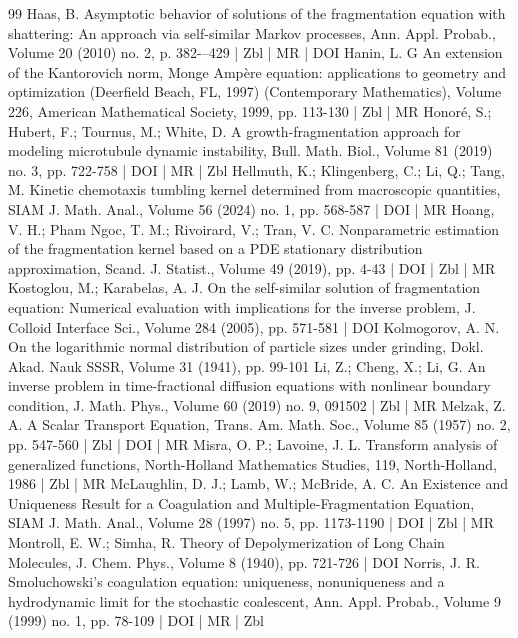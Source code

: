 \documentclass[10pt]{amsart}
\theoremstyle{definition}\newtheorem{defi}[theo]{Definition}\newtheorem{rema}[theo]{Remark}\newtheorem{exam}[theo]{Example}\newtheorem{exem}[theo]{Example}\newtheorem{nota}[theo]{Notation}
\begin{document}
\begin{thebibliography}{99}
Haas, B. Asymptotic behavior of solutions of the fragmentation equation with shattering: An approach via self-similar Markov processes, Ann. Appl. Probab., Volume 20 (2010) no. 2, p. 382-–429 | Zbl | MR | DOI
Hanin, L. G An extension of the Kantorovich norm, Monge Ampère equation: applications to geometry and optimization (Deerfield Beach, FL, 1997) (Contemporary Mathematics), Volume 226, American Mathematical Society, 1999, pp. 113-130 | Zbl | MR
Honoré, S.; Hubert, F.; Tournus, M.; White, D. A growth-fragmentation approach for modeling microtubule dynamic instability, Bull. Math. Biol., Volume 81 (2019) no. 3, pp. 722-758 | DOI | MR | Zbl
Hellmuth, K.; Klingenberg, C.; Li, Q.; Tang, M. Kinetic chemotaxis tumbling kernel determined from macroscopic quantities, SIAM J. Math. Anal., Volume 56 (2024) no. 1, pp. 568-587 | DOI | MR
Hoang, V. H.; Pham Ngoc, T. M.; Rivoirard, V.; Tran, V. C. Nonparametric estimation of the fragmentation kernel based on a PDE stationary distribution approximation, Scand. J. Statist., Volume 49 (2019), pp. 4-43 | DOI | Zbl | MR
Kostoglou, M.; Karabelas, A. J. On the self-similar solution of fragmentation equation: Numerical evaluation with implications for the inverse problem, J. Colloid Interface Sci., Volume 284 (2005), pp. 571-581 | DOI
Kolmogorov, A. N. On the logarithmic normal distribution of particle sizes under grinding, Dokl. Akad. Nauk SSSR, Volume 31 (1941), pp. 99-101
Li, Z.; Cheng, X.; Li, G. An inverse problem in time-fractional diffusion equations with nonlinear boundary condition, J. Math. Phys., Volume 60 (2019) no. 9, 091502 | Zbl | MR
Melzak, Z. A. A Scalar Transport Equation, Trans. Am. Math. Soc., Volume 85 (1957) no. 2, pp. 547-560 | Zbl | DOI | MR
Misra, O. P.; Lavoine, J. L. Transform analysis of generalized functions, North-Holland Mathematics Studies, 119, North-Holland, 1986 | Zbl | MR
McLaughlin, D. J.; Lamb, W.; McBride, A. C. An Existence and Uniqueness Result for a Coagulation and Multiple-Fragmentation Equation, SIAM J. Math. Anal., Volume 28 (1997) no. 5, pp. 1173-1190 | DOI | Zbl | MR
Montroll, E. W.; Simha, R. Theory of Depolymerization of Long Chain Molecules, J. Chem. Phys., Volume 8 (1940), pp. 721-726 | DOI
Norris, J. R. Smoluchowski’s coagulation equation: uniqueness, nonuniqueness and a hydrodynamic limit for the stochastic coalescent, Ann. Appl. Probab., Volume 9 (1999) no. 1, pp. 78-109 | DOI | MR | Zbl

\end{thebibliography}
\end{document}
